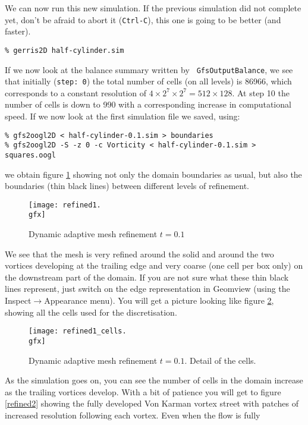\documentclass[a4paper]{article}
\begin{document}
We can now run this new simulation. If the previous simulation did not
complete yet, don't be afraid to abort it ({\tt Ctrl-C}), this one is going to
be better (and faster).
\begin{verbatim}
% gerris2D half-cylinder.sim
\end{verbatim}
If we now look at the balance summary written by {\tt
GfsOutputBalance}, we see that initially ({\tt step: 0}) the total
number of cells (on all levels) is 86966, which corresponds to a
constant resolution of $4\times 2^7\times 2^7=512\times 128$. At step
10 the number of cells is down to 990 with a corresponding increase in 
computational speed. If we now look at the first simulation file we
saved, using:
\begin{verbatim}
% gfs2oogl2D < half-cylinder-0.1.sim > boundaries
% gfs2oogl2D -S -z 0 -c Vorticity < half-cylinder-0.1.sim > squares.oogl
\end{verbatim}
we obtain figure \ref{refined1} showing not only the domain boundaries 
as usual, but also the boundaries (thin black lines) between different
levels of refinement.
\begin{figure}[htbp]
\begin{center}
\texttt{[image: refined1.\\gfx]}
\end{center}
\caption{Dynamic adaptive mesh refinement $t=0.1$}
\label{refined1}
\end{figure}
We see that the mesh is very refined around the solid and around the
two vortices developing at the trailing edge and very coarse (one cell
per box only) on the downstream part of the domain. If you are not
sure what these thin black lines represent, just switch on the edge
representation in Geomview (using the Inspect$\rightarrow$Appearance menu). You
will get a picture looking like figure \ref{refined1-cells}, showing
all the cells used for the discretisation.
\begin{figure}[htbp]
\begin{center}
\texttt{[image: refined1\_cells.\\gfx]}
\end{center}
\caption{Dynamic adaptive mesh refinement $t=0.1$. Detail of the cells.}
\label{refined1-cells}
\end{figure}
As the simulation goes on, you can see the number of cells in the
domain increase as the trailing vortices develop. With a bit of
patience you will get to figure \ref{refined2} showing the fully
developed Von Karman vortex street with patches of increased
resolution following each vortex. Even when the flow is fully
\end{document}
